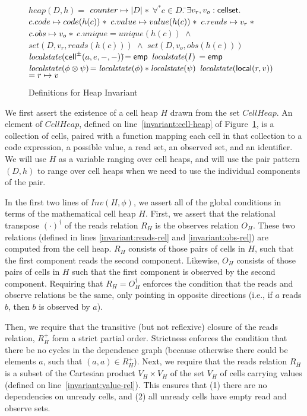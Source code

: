 \documentclass[natbib]{sigplanconf}
\begin{document}
\begin{figure}
{\begin{specification}
$heap(D,h) = $ \nextline
\;\;$counter \mapsto |D| \;* $ \nextline
\;\;$\forall^* c \in D.\;$\=$\exists v_r, v_o : \mbox{\textsf{{cellset}}}.\;$ \nextline
                         \>$c.code \mapsto code(h(c))   \;* $ \nextline
                         \>$c.value \mapsto value(h(c)) \;* $ \nextline
                         \>$c.reads \mapsto v_r \;* $ \nextline
                         \>$c.obs   \mapsto v_o \;* $ \nextline
                         \>$c.unique  = unique(h(c)) \;\land$ \nextline
                         \>$set(D, v_r, reads(h(c))) \;\land$ \nextline
                         \>$set(D, v_o, obs(h(c)))$
$\mathit{localstate}(\mbox{\textsf{{cell}}}^{\pm}({a}, {e}, {-}, {-}))$\=$= \mathsf{emp}$ \nextline
$\mathit{localstate}(I)$                \>$= \mathsf{emp}$ \nextline
$\mathit{localstate}(\phi \otimes \psi)$\>$= \mathit{localstate}(\phi) * \mathit{localstate}(\psi)$ \nextline
$\mathit{localstate}(\mbox{\textsf{{local}}}({r}, {v}))$  \>$= r \mapsto v$ 
\end{specification}
}
\caption{Definitions for Heap Invariant}
\label{heap-invariant}
\end{figure}

We first assert the existence of a cell heap $H$ drawn from the set
$CellHeap$.  An element of $CellHeap$, defined on
line~\ref{invariant:cell-heap} of Figure~\ref{heap-invariant}, is a
collection of cells, paired with a function mapping each cell in that
collection to a code expression, a possible value, a read set, an
observed set, and an identifier. We will use $H$ as a variable ranging
over cell heaps, and will use the pair pattern $(D,h)$ to range over
cell heaps when we need to use the individual components of the pair.

In the first two lines of $Inv(H, \phi)$, we assert all of the global
conditions in terms of the mathematical cell heap $H$. First, we
assert that the relational transpose $(\cdot)^\dagger$ of the reads
relation $R_H$ is the observes relation $O_H$. These two relations
(defined in lines \ref{invariant:reads-rel} and
\ref{invariant:obs-rel}) are computed from the cell heap. $R_H$
consists of those pairs of cells in $H$, such that the first component
reads the second component. Likewise, $O_H$ consists of those pairs of
cells in $H$ such that the first component is observed by the second
component.  Requiring that $R_H = O^\dagger_H$ enforces the condition
that the reads and observe relations be the same, only pointing in
opposite directions (i.e., if $a$ reads $b$, then $b$ is observed by
$a$).

Then, we require that the transitive (but not reflexive) closure of
the reads relation, $R^+_H$ form a strict partial order. Strictness
enforces the condition that there be no cycles in the dependence graph
(because otherwise there could be elements $a$, such that $(a, a) \in
R^+_H$).  Next, we require that the reads relation $R_H$ is a subset
of the Cartesian product $V_H \times V_H$ of the set $V_H$ of cells
carrying values (defined on line~\ref{invariant:value-rel}). This
ensures that (1) there are no dependencies on unready cells, and (2)
all unready cells have empty read and observe sets.
\end{document}
